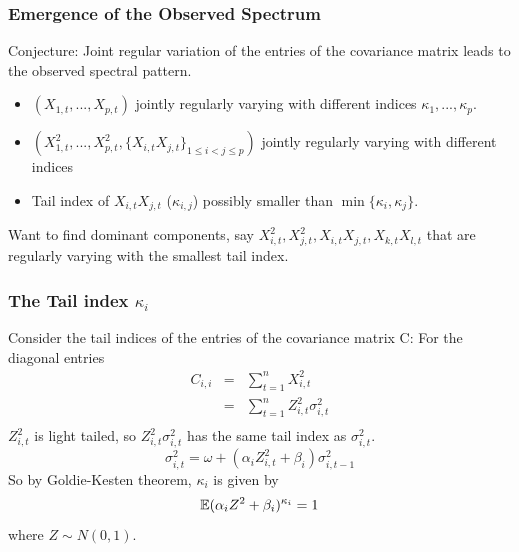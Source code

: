 \documentclass{beamer}
\begin{document}
\begin{frame}
  \frametitle{Emergence of the Observed Spectrum}
  Conjecture: Joint regular variation of the entries of the covariance
  matrix leads to the observed spectral pattern.
  \begin{itemize}
  \item $(X_{1,t}, ..., X_{p,t})$ jointly regularly varying with
    different indices $\kappa_1, ..., \kappa_p$.
  \item $(X_{1,t}^2, ..., X_{p,t}^2, \{X_{i,t} X_{j,t}\}_{1 \leq i < j
      \leq p})$ jointly regularly varying with different indices
  \item Tail index of $X_{i,t} X_{j,t}$ ($\kappa_{i,j}$) possibly
    smaller than $\min\{\kappa_i, \kappa_j\}$.
  \end{itemize}
  Want to find dominant components, say $X_{i,t}^2, X_{j,t}^2,
  X_{i,t} X_{j,t}, X_{k,t} X_{l,t}$ that are regularly varying with
  the smallest tail index.
\end{frame}

\begin{frame}
  \frametitle{The Tail index $\kappa_i$}
  Consider the tail indices of the entries of the covariance matrix C:
  For the diagonal entries
    \begin{eqnarray*}
      C_{i, i} &=& \sum_{t=1}^n X_{i, t}^2 \\
               &=& \sum_{t=1}^n Z_{i, t}^2 \sigma_{i, t}^2 \\
    \end{eqnarray*}
    $Z_{i, t}^2$ is light tailed, so $Z_{i, t}^2 \sigma_{i, t}^2$ has
    the same tail index as $\sigma_{i, t}^2$.
    \[
    \sigma_{i, t}^2 = \omega + (\alpha_i Z_{i,t}^2 + \beta_i)\sigma_{i,t-1}^2
    \]
    So by Goldie-Kesten theorem, $\kappa_i$ is given by
    \[
    \mathbb{E} (\alpha_i Z^2 + \beta_i)^{\kappa_i} = 1
    \]
    where $Z \sim N(0, 1)$.
  \end{frame}
\end{document}
